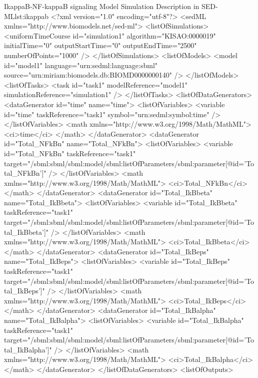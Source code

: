 \footnotesize
\begin{myXmlLst}{IkappaB-NF-kappaB signaling Model Simulation Description in SED-ML}{lst:ikappab}
<?xml version="1.0" encoding="utf-8"?>
<sedML xmlns="http://www.biomodels.net/sed-ml">
  <listOfSimulations>
    <uniformTimeCourse id="simulation1" algorithm="KISAO:0000019"
    initialTime="0" outputStartTime="0" outputEndTime="2500"
    numberOfPoints="1000" />
  </listOfSimulations>
  <listOfModels>
    <model id="model1" language="urn:sedml:language:sbml" source="urn:miriam:biomodels.db:BIOMD0000000140" />
  </listOfModels>
  <listOfTasks>
    <task id="task1" modelReference="model1"
    simulationReference="simulation1" />
  </listOfTasks>
  <listOfDataGenerators>
    <dataGenerator id="time" name="time">
      <listOfVariables>
        <variable id="time" taskReference="task1" symbol="urn:sedml:symbol:time" />
      </listOfVariables>
      <math xmlns="http://www.w3.org/1998/Math/MathML">
        <ci>time</ci>
      </math>
    </dataGenerator>
    <dataGenerator id="Total_NFkBn" name="Total_NFkBn">
      <listOfVariables>
        <variable id="Total_NFkBn" taskReference="task1"
        target="/sbml:sbml/sbml:model/sbml:listOfParameters/sbml:parameter[@id='Total_NFkBn']" />
      </listOfVariables>
      <math xmlns="http://www.w3.org/1998/Math/MathML">
        <ci>Total_NFkBn</ci>
      </math>
    </dataGenerator>
    <dataGenerator id="Total_IkBbeta" name="Total_IkBbeta">
      <listOfVariables>
        <variable id="Total_IkBbeta" taskReference="task1"
        target="/sbml:sbml/sbml:model/sbml:listOfParameters/sbml:parameter[@id='Total_IkBbeta']" />
      </listOfVariables>
      <math xmlns="http://www.w3.org/1998/Math/MathML">
        <ci>Total_IkBbeta</ci>
      </math>
    </dataGenerator>
    <dataGenerator id="Total_IkBeps" name="Total_IkBeps">
      <listOfVariables>
        <variable id="Total_IkBeps" taskReference="task1"
        target="/sbml:sbml/sbml:model/sbml:listOfParameters/sbml:parameter[@id='Total_IkBeps']" />
      </listOfVariables>
      <math xmlns="http://www.w3.org/1998/Math/MathML">
        <ci>Total_IkBeps</ci>
      </math>
    </dataGenerator>
    <dataGenerator id="Total_IkBalpha" name="Total_IkBalpha">
      <listOfVariables>
        <variable id="Total_IkBalpha" taskReference="task1"
        target="/sbml:sbml/sbml:model/sbml:listOfParameters/sbml:parameter[@id='Total_IkBalpha']" />
      </listOfVariables>
      <math xmlns="http://www.w3.org/1998/Math/MathML">
        <ci>Total_IkBalpha</ci>
      </math>
    </dataGenerator>
  </listOfDataGenerators>
  <listOfOutputs>

\end{myXmlLst}
